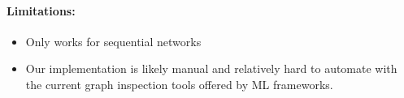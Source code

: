 \paragraph{Limitations:}
\begin{itemize}
\item Only works for sequential networks
\item Our implementation is likely manual and relatively hard to automate with the current graph inspection tools offered by ML frameworks.
\end{itemize}




